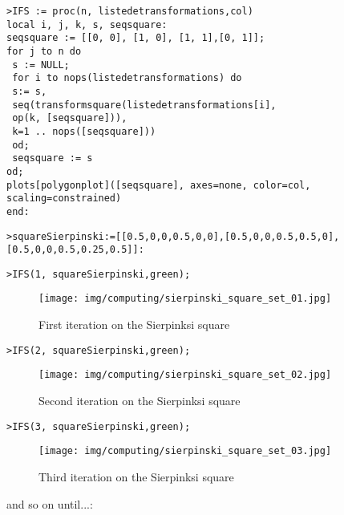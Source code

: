 	\texttt{>IFS := proc(n, liste\textunderscore de\textunderscore transformations,col)}\\
     \texttt{local i, j, k, s, seq\textunderscore  square:}\\
     \texttt{seq\textunderscore square := [[0, 0], [1, 0], [1, 1],[0, 1]];}\\
     \texttt{for j to n do}\\
     \texttt{   s := NULL;}\\   
     \texttt{   for i to nops(liste\textunderscore de\textunderscore transformations) do}\\
        \texttt{   {} {} {} s:= s,}\\
        \texttt{   {} {} {} seq(transform\textunderscore square(liste\textunderscore de\textunderscore transformations[i],}\\
        \texttt{   {} {} {} op(k, [seq\textunderscore square])),}\\
        \texttt{   {} {} {} k=1 .. nops([seq\textunderscore square]))}\\
       \texttt{   {} {} {} od;}\\       
      \texttt{   {} {} {} seq\textunderscore square := s}\\
    \texttt{od;}\\
    \texttt{plots[polygonplot]([seq\textunderscore square], axes=none, color=col, scaling=constrained)}\\
  	\texttt{end:}
  	  	
	\texttt{>square\textunderscore  Sierpinski:=[[0.5,0,0,0.5,0,0],[0.5,0,0,0.5,0.5,0], [0.5,0,0,0.5,0.25,0.5]]:}

	\texttt{>IFS(1, square\textunderscore  Sierpinski,green);}
	\begin{figure}[H]
		\centering
		\texttt{[image: img/computing/sierpinski\_square\_set\_01.jpg]}
		\caption[]{First iteration on the Sierpinksi square}
	\end{figure}
	\texttt{>IFS(2, square\textunderscore  Sierpinski,green);}
	\begin{figure}[H]
		\centering
		\texttt{[image: img/computing/sierpinski\_square\_set\_02.jpg]}
		\caption[]{Second iteration on the Sierpinksi square}
	\end{figure}
	\texttt{>IFS(3, square\textunderscore  Sierpinski,green);}
	\begin{figure}[H]
		\centering
		\texttt{[image: img/computing/sierpinski\_square\_set\_03.jpg]}
		\caption[]{Third iteration on the Sierpinksi square}
	\end{figure}
	and so on until...:
	

